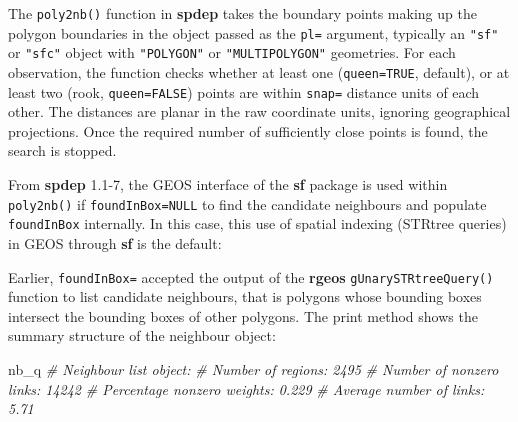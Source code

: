 \documentclass[]{book}
\newenvironment{Shaded}{\begin{snugshade}}{\end{snugshade}}
\newcommand{\CommentTok}[1]{\textcolor[rgb]{0.56,0.35,0.01}{\textit{#1}}}
\newcommand{\DataTypeTok}[1]{\textcolor[rgb]{0.13,0.29,0.53}{#1}}
\newcommand{\KeywordTok}[1]{\textcolor[rgb]{0.13,0.29,0.53}{\textbf{#1}}}
\newcommand{\NormalTok}[1]{#1}
\newcommand{\OperatorTok}[1]{\textcolor[rgb]{0.81,0.36,0.00}{\textbf{#1}}}
\newcommand{\OtherTok}[1]{\textcolor[rgb]{0.56,0.35,0.01}{#1}}
\newcommand{\StringTok}[1]{\textcolor[rgb]{0.31,0.60,0.02}{#1}}
\begin{document}
The \texttt{poly2nb()} function in \textbf{spdep} takes the boundary points making up the polygon boundaries in the object passed as the \texttt{pl=} argument, typically an \texttt{"sf"} or \texttt{"sfc"} object with \texttt{"POLYGON"} or \texttt{"MULTIPOLYGON"} geometries. For each observation, the function checks whether at least one (\texttt{queen=TRUE}, default), or at least two (rook, \texttt{queen=FALSE}) points are within \texttt{snap=} distance units of each other. The distances are planar in the raw coordinate units, ignoring geographical projections. Once the required number of sufficiently close points is found, the search is stopped.

\begin{Shaded}
\end{Shaded}

From \textbf{spdep} 1.1-7, the GEOS interface of the \textbf{sf} package is used within \texttt{poly2nb()} if \texttt{foundInBox=NULL} to find the candidate neighbours and populate \texttt{foundInBox} internally. In this case, this use of spatial indexing (STRtree queries) in GEOS through \textbf{sf} is the default:

\begin{Shaded}
\end{Shaded}

Earlier, \texttt{foundInBox=} accepted the output of the \textbf{rgeos} \texttt{gUnarySTRtreeQuery()} function to list candidate neighbours, that is polygons whose bounding boxes intersect the bounding boxes of other polygons. The print method shows the summary structure of the neighbour object:

\begin{Shaded}
\begin{Highlighting}[]
\NormalTok{nb_q}
\CommentTok{# Neighbour list object:}
\CommentTok{# Number of regions: 2495 }
\CommentTok{# Number of nonzero links: 14242 }
\CommentTok{# Percentage nonzero weights: 0.229 }
\CommentTok{# Average number of links: 5.71}
\end{Highlighting}
\end{Shaded}
\end{document}
